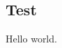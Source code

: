 \documentclass[phd, zdraft]{iitmdissertation}
\begin{document}
\prematter
  \printCertificate
\begin{FrontMatter}
  \printGlossaryAndAbbreviations
\end{FrontMatter}
\begin{MainMatter}
\chapter{Test}
Hello world.
\end{MainMatter}
\begin{BackMatter}
\end{BackMatter}
\end{document}
